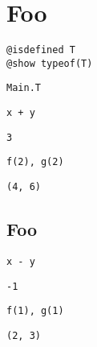 \section{Foo}



\label{17415245328842318541}{}



\begin{lstlisting}[]
@isdefined T
@show typeof(T)
\end{lstlisting}


\begin{lstlisting}[]
Main.T
\end{lstlisting}




\begin{lstlisting}[]
x + y
\end{lstlisting}


\begin{lstlisting}[]
3
\end{lstlisting}




\begin{lstlisting}[]
f(2), g(2)
\end{lstlisting}


\begin{lstlisting}[]
(4, 6)
\end{lstlisting}



\subsection{Foo}



\label{17607918834103512029}{}



\begin{lstlisting}[]
x - y
\end{lstlisting}


\begin{lstlisting}[]
-1
\end{lstlisting}




\begin{lstlisting}[]
f(1), g(1)
\end{lstlisting}


\begin{lstlisting}[]
(2, 3)
\end{lstlisting}




